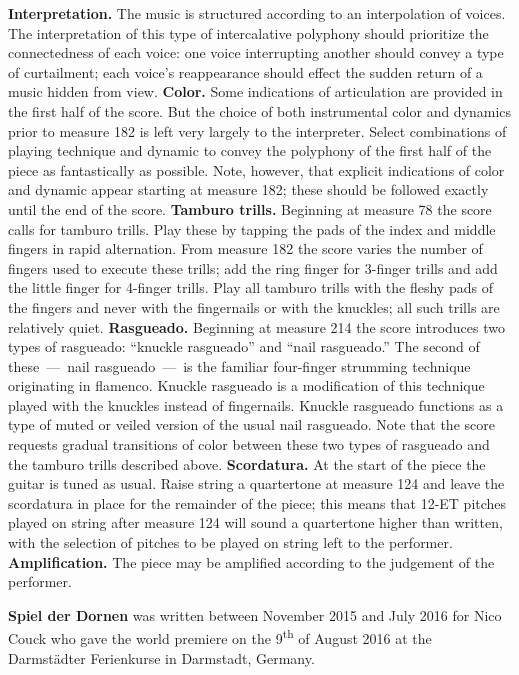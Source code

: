 \documentclass[10pt]{article}
\begin{document}
\begin{textblock}{11.5}
\textbf{Interpretation.} The music is structured according to an interpolation
of voices. The interpretation of this type of intercalative polyphony should
prioritize the connectedness of each voice: one voice interrupting another
should convey a type of curtailment; each voice's reappearance should effect
the sudden return of a music hidden from view. \textbf{Color.} Some indications
of articulation are provided in the first half of the score. But the choice of
both instrumental color and dynamics prior to measure 182 is left very largely
to the interpreter. Select combinations of playing technique and dynamic to
convey the polyphony of the first half of the piece as fantastically as
possible. Note, however, that explicit indications of color and dynamic appear
starting at measure 182; these should be followed exactly until the end of the
score. \textbf{Tamburo trills.} Beginning at measure 78 the score calls for
tamburo trills. Play these by tapping the pads of the index and middle fingers
in rapid alternation. From measure 182 the score varies the number of fingers
used to execute these trills; add the ring finger for 3-finger trills and add
the little finger for 4-finger trills. Play all tamburo trills with the fleshy
pads of the fingers and never with the fingernails or with the knuckles; all
such trills are relatively quiet. \textbf{Rasgueado.} Beginning at measure 214
the score introduces two types of rasgueado: ``knuckle rasgueado'' and ``nail
rasgueado.'' The second of these~---~nail rasgueado~---~is the familiar
four-finger strumming technique originating in flamenco. Knuckle rasgueado is a
modification of this technique played with the knuckles instead of fingernails.
Knuckle rasgueado functions as a type of muted or veiled version of the usual
nail rasgueado. Note that the score requests gradual transitions of color
between these two types of rasgueado and the tamburo trills described above.
\textbf{Scordatura.} At the start of the piece the guitar is tuned as usual.
Raise string  a quartertone at measure 124 and leave the scordatura
in place for the remainder of the piece; this means that 12-ET pitches played
on string  after measure 124 will sound a quartertone higher than
written, with the selection of pitches to be played on string  left
to the performer. \textbf{Amplification.} The piece may be amplified according
to the judgement of the performer.

\textbf{Spiel der Dornen} was written between November 2015 and July 2016 for
Nico Couck who gave the world premiere on the 9\textsuperscript{th} of August
2016 at the Darmst\"{a}dter Ferienkurse in Darmstadt, Germany.

\end{textblock}
\end{document}

